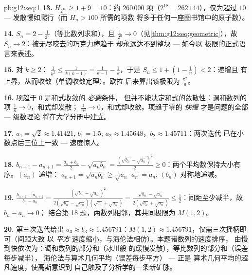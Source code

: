 \begin{solution}{pb:g12:seq:1}
\textbf{13.} $H_{2^{18}} \geq 1 + 9 = 10$：约
$260\,000$ 项（$2^{18} = 262\,144$），仅为超过 $10$ ---
发散慢如爬行（而 $H_n > 100$ 所需的项数
将多于任何一座图书馆中的原子数）。

\textbf{14.} $S_n = 2 - \frac{1}{2^n}$（等比数列求和），且
$\frac{1}{2^n} \to 0$（见\cref{thm:g12:seq:geometric}），故
$S_n \to 2$：被无尽咬去的巧克力棒趋于
却永远达不到整块 --- 如今以
极限的正式语言来表述。

\textbf{15.} 对 $k \geq 2$：
$\frac{1}{k^2} \leq \frac{1}{k(k-1)} = \frac{1}{k-1} -
\frac1k$，于是
$S_n \leq 1 + \left(1 - \frac1n\right) < 2$：递增且
有上界，从而收敛（单调收敛定理）。欧拉
后来算出该极限为 $\frac{\pi^2}{6}$。

\textbf{16.} 项趋于 $0$ 是和式收敛的 \emph{必要}条件，
但并不能决定和式的敛散性：调和数列的项
$\frac1n \to 0$，和式却发散；
$\frac{1}{n^2} \to 0$，和式却收敛。项趋于零的 \emph{快慢}
才是问题的全部 --- 级数理论
将在大学分册中建立。

\textbf{17.} $a_1 = \sqrt2 \approx 1.41421$, $b_1 = 1.5$;
$a_2 \approx 1.45648$，$b_2 \approx 1.45711$：两次迭代
已在小数点后三位上一致 --- 速度惊人。

\textbf{18.} $b_{n+1} - a_{n+1} = \frac{a_n + b_n}{2} -
\sqrt{a_n b_n} = \frac{(\sqrt{b_n} - \sqrt{a_n})^2}{2} \geq
0$：两个平均数保持大小有序。$(a_n)$ 递增：
$a_{n+1} = \sqrt{a_n b_n} \geq \sqrt{a_n \cdot a_n} = a_n$;
$(b_n)$ 对称地递减。

\textbf{19.} $\frac{b_{n+1} - a_{n+1}}{b_n - a_n} =
\frac{(\sqrt{b_n} - \sqrt{a_n})^2}
{2(\sqrt{b_n} - \sqrt{a_n})(\sqrt{b_n} + \sqrt{a_n})}
= \frac{\sqrt{b_n} - \sqrt{a_n}}{2(\sqrt{b_n} + \sqrt{a_n})}
\leq \frac12$：间距至少减半，故 $b_n - a_n \to 0$；
结合第 18 题，两数列相邻，其共同极限为
$M(1, 2)$。

\textbf{20.} 第三次迭代给出
$a_3 \approx b_3 \approx 1.456791$：$M(1, 2) \approx
1.456791$，仅需三次摇柄即可（间距大致
以 \emph{平方} 速度缩小，与海伦法相仿）。本题诸数列的速度排序，
由慢到快依次为：调和数列的部分和（冰川般
的缓慢发散），等比数列的部分和（误差每步减半），
海伦法与算术几何平均（误差每步平方） --- 正是
算术几何平均的超凡速度，使高斯意识到
自己触及了分析学的一条新矿脉。
\end{solution}
